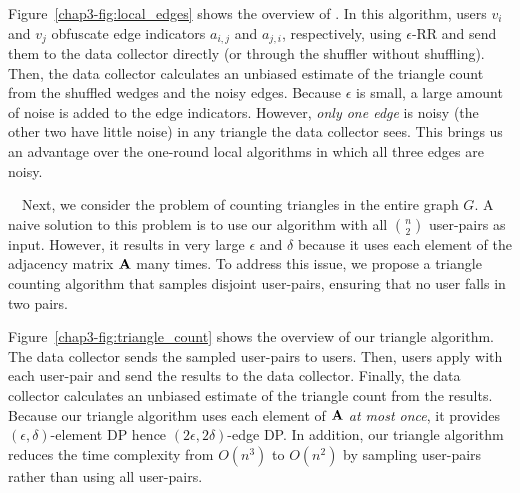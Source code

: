 Figure~\ref{chap3-fig:local_edges} shows the overview of \AlgWSLE{}.
In this algorithm, users $v_i$ and $v_j$ obfuscate edge indicators $a_{i,j}$ and $a_{j,i}$, respectively, using $\epsilon$-RR and send them to the data collector directly (or through the shuffler without shuffling).
Then, the data collector calculates an unbiased estimate of the triangle count
from the shuffled wedges and the noisy edges.
Because $\epsilon$ is small, a large amount of noise is added to the edge indicators.
However, \textit{only one edge} is noisy (the other two have little noise) in any triangle the data collector sees.
This brings us an advantage over the one-round local algorithms in which all three edges are noisy.

\smallskip
{}~~Next, we consider the problem of counting triangles in the entire graph $G$.
A naive solution to this problem is to use our
\AlgWSLE{} algorithm
with all $\binom{n}{2}$ user-pairs as input.
However, it results in very large $\epsilon$ and $\delta$ because it uses each element of the adjacency matrix $\mathbf{A}$ many times.
To address this issue,
we propose a triangle counting algorithm that samples
disjoint user-pairs, ensuring that no user falls in two pairs. 

Figure~\ref{chap3-fig:triangle_count} shows the overview of our triangle algorithm.
The data collector sends the sampled user-pairs to users.
Then, users apply
\AlgWSLE{}
with each user-pair
and send the results to the data collector.
Finally, the data collector calculates an unbiased estimate of the triangle count from the results.
Because our triangle algorithm uses each element of
$\mathbf{A}$ \textit{at most once}, it provides $(\epsilon,\delta)$-element DP hence $(2\epsilon,2\delta)$-edge DP.
In addition, our triangle algorithm reduces the time complexity from $O(n^3)$ to $O(n^2)$ by sampling user-pairs rather than using all user-pairs.

